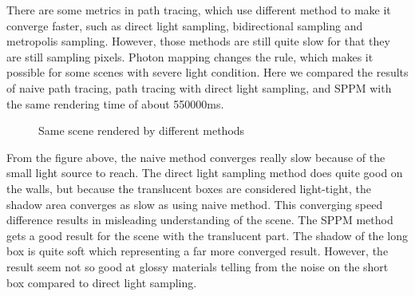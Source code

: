\documentclass[acmtog]{acmart}
\begin{document}
	There are some metrics in path tracing, which use different method to make it converge faster, such as direct light sampling, bidirectional sampling and metropolis sampling.
	However, those methods are still quite slow for that they are still sampling pixels.
	Photon mapping changes the rule, which makes it possible for some scenes with severe light condition.
	Here we compared the results of naive path tracing, path tracing with direct light sampling, and SPPM with the same rendering time of about 550000ms.
	\begin{figure}[H]
		\centering
		
		\caption{Same scene rendered by different methods}
	\end{figure} 
	From the figure above, the naive method converges really slow because of the small light source to reach.
	The direct light sampling method does quite good on the walls, but because the translucent boxes are considered light-tight,
	the shadow area converges as slow as using naive method. 
	This converging speed difference results in misleading understanding of the scene.
	The SPPM method gets a good result for the scene with the translucent part. 
	The shadow of the long box is quite soft which representing a far more converged result.
	However, the result seem not so good at glossy materials telling from the noise on the short box compared to direct light sampling.
\end{document}
